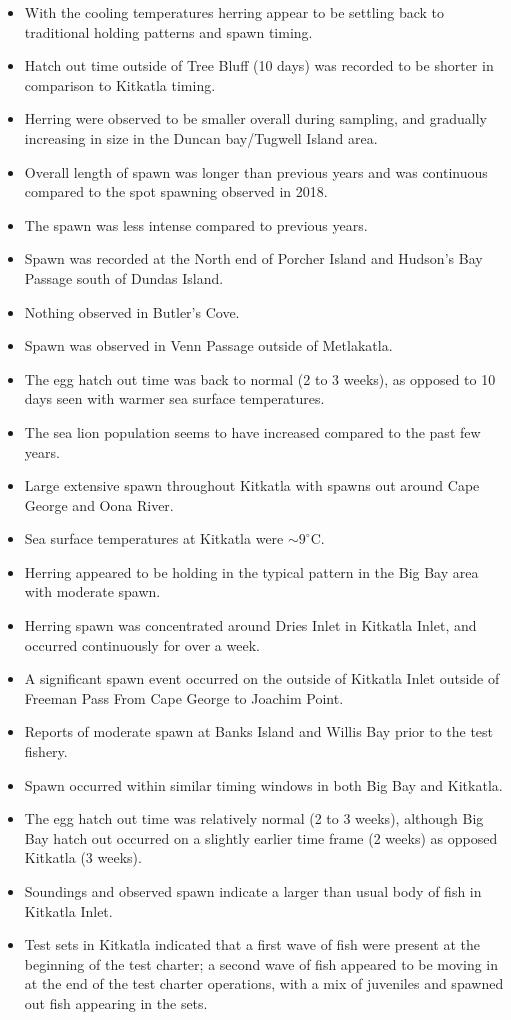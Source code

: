 \begin{itemize}
\item With the cooling temperatures herring appear to be settling back to traditional holding patterns and spawn timing. 
\item Hatch out time outside of Tree Bluff (10 days) was recorded to be shorter in comparison to Kitkatla timing. 
\item Herring were observed to be smaller overall during sampling, and gradually increasing in size in the Duncan bay/Tugwell Island area. 
\item Overall length of spawn was longer than previous years and was continuous compared to the spot spawning observed in 2018. 
\item The spawn was less intense compared to previous years.
\item Spawn was recorded at the North end of Porcher Island and Hudson's Bay Passage south of Dundas Island.
\item Nothing observed in Butler's Cove. 
\item Spawn was observed in Venn Passage outside of Metlakatla. 
\item The egg hatch out time was back to normal (2 to 3 weeks), as opposed to 10 days seen with warmer sea surface temperatures.
\item The sea lion population seems to have increased compared to the past few years.
\item Large extensive spawn throughout Kitkatla with spawns out around Cape George and Oona River.
\item Sea surface temperatures at Kitkatla were $\sim9^\circ\text{C}$.
\item Herring appeared to be holding in the typical pattern in the Big Bay area with moderate spawn. 
\item Herring spawn was concentrated around Dries Inlet in Kitkatla Inlet, and occurred continuously for over a week. 
\item A significant spawn event occurred on the outside of Kitkatla Inlet outside of Freeman Pass From Cape George to Joachim Point. 
\item Reports of moderate spawn at Banks Island and Willis Bay prior to the test fishery. 
\item Spawn occurred within similar timing windows in both Big Bay and Kitkatla. 
\item The egg hatch out time was relatively normal (2 to 3 weeks), although Big Bay hatch out occurred on a slightly earlier time frame (2 weeks) as opposed Kitkatla (3 weeks).
\item Soundings and observed spawn indicate a larger than usual body of fish in Kitkatla Inlet. 
\item Test sets in Kitkatla indicated that a first wave of fish were present at the beginning of the test charter; a second wave of fish appeared to be moving in at the end of the test charter operations, with a mix of juveniles and spawned out fish appearing in the sets. 
\end{itemize}